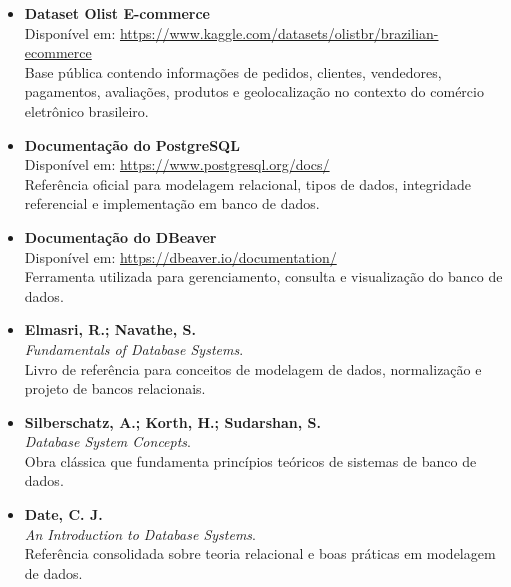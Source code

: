\documentclass[12pt,a4paper]{article}
\begin{document}
\begin{itemize}

\item \textbf{Dataset Olist E-commerce} \\
Disponível em: \url{https://www.kaggle.com/datasets/olistbr/brazilian-ecommerce} \\
Base pública contendo informações de pedidos, clientes, vendedores, pagamentos, avaliações, produtos e geolocalização no contexto do comércio eletrônico brasileiro.

\item \textbf{Documentação do PostgreSQL} \\
Disponível em: \url{https://www.postgresql.org/docs/} \\
Referência oficial para modelagem relacional, tipos de dados, integridade referencial e implementação em banco de dados.

\item \textbf{Documentação do DBeaver} \\
Disponível em: \url{https://dbeaver.io/documentation/} \\
Ferramenta utilizada para gerenciamento, consulta e visualização do banco de dados.

\item \textbf{Elmasri, R.; Navathe, S.} \\
\textit{Fundamentals of Database Systems}. \\
Livro de referência para conceitos de modelagem de dados, normalização e projeto de bancos relacionais.

\item \textbf{Silberschatz, A.; Korth, H.; Sudarshan, S.} \\
\textit{Database System Concepts}. \\
Obra clássica que fundamenta princípios teóricos de sistemas de banco de dados.

\item \textbf{Date, C. J.} \\
\textit{An Introduction to Database Systems}. \\
Referência consolidada sobre teoria relacional e boas práticas em modelagem de dados.

\end{itemize}
\end{document}
